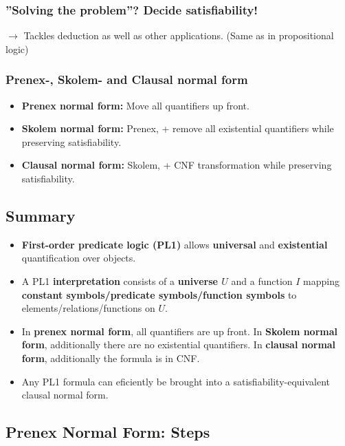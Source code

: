 \documentclass[conference, a4paper]{styles/acmsiggraph}
\begin{document}
        \subsubsection{''Solving the problem''? Decide satisfiability!}
            $\rightarrow$ Tackles deduction as well as other applications. (Same as in propositional logic)

        \subsubsection{Prenex-, Skolem- and Clausal normal form}
            \begin{itemize}
                \item \textbf{Prenex normal form:} Move all quantifiers up front.
                \item \textbf{Skolem normal form:} Prenex, + remove all existential quantifiers while preserving satisfiability.
                \item \textbf{Clausal normal form:} Skolem, + CNF transformation while preserving satisfiability.
            \end{itemize}
        
    \subsection{Summary}
        \begin{itemize}
            \item \textbf{First-order predicate logic (PL1)} allows \textbf{universal} and \textbf{existential} quantification over objects.
            \item A PL1 \textbf{interpretation} consists of a \textbf{universe $U$} and a function $I$ mapping \textbf{constant symbols/predicate symbols/function symbols} to elements/relations/functions on $U$.
            \item In \textbf{prenex normal form}, all quantifiers are up front. In \textbf{Skolem normal form}, additionally there are no existential quantifiers. In \textbf{clausal normal form}, additionally the formula is in CNF.
            \item Any PL1 formula can eficiently be brought into a satisfiability-equivalent clausal normal form.
        \end{itemize}
    
    \subsection{Prenex Normal Form: Steps}
\end{document}
